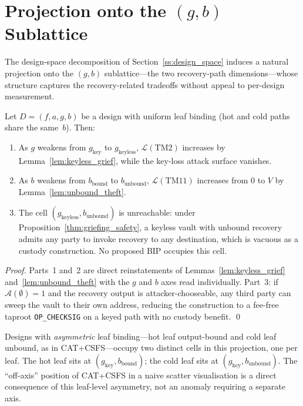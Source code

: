 \section{Projection onto the $(g, b)$ Sublattice} \label{se:two_dim}

The design-space decomposition of Section~\ref{ss:design_space} induces
a natural projection onto the $(g, b)$ sublattice---the two recovery-path
dimensions---whose structure captures the recovery-related tradeoffs
without appeal to per-design measurement.

\begin{lemma}\label{lem:projection}
Let $D = (f, a, g, b)$ be a design with uniform leaf binding (hot and
cold paths share the same~$b$). Then:
\begin{enumerate}
  \item As $g$ weakens from $g_{\text{key}}$ to $g_{\text{keyless}}$,
    $\mathcal{L}(\mathrm{TM2})$ increases by
    Lemma~\ref{lem:keyless_grief}, while the key-loss attack surface
    vanishes.
  \item As $b$ weakens from $b_{\text{bound}}$ to $b_{\text{unbound}}$,
    $\mathcal{L}(\mathrm{TM11})$ increases from $0$ to $V$ by
    Lemma~\ref{lem:unbound_theft}.
  \item The cell $(g_{\text{keyless}}, b_{\text{unbound}})$ is
    unreachable: under Proposition~\ref{thm:griefing_safety}, a
    keyless vault with unbound recovery admits any party to invoke
    recovery to any destination, which is vacuous as a custody
    construction. No proposed BIP occupies this cell.
\end{enumerate}
\end{lemma}

\begin{proof}
Parts~1 and~2 are direct reinstatements of
Lemmas~\ref{lem:keyless_grief} and~\ref{lem:unbound_theft} with the $g$
and $b$ axes read individually. Part~3: if $\mathcal{A}(\emptyset) = 1$
and the recovery output is attacker-chooseable, any third party can
sweep the vault to their own address, reducing the construction to a
fee-free taproot \texttt{OP\_CHECKSIG} on a keyed path with no custody
benefit. \qed
\end{proof}

\begin{remark}\label{rem:asymmetric_binding}
Designs with \emph{asymmetric} leaf binding---hot leaf output-bound
and cold leaf unbound, as in CAT+CSFS---occupy two distinct cells in
this projection, one per leaf. The hot leaf sits at
$(g_{\text{key}}, b_{\text{bound}})$; the cold leaf sits at
$(g_{\text{key}}, b_{\text{unbound}})$. The ``off-axis'' position of
CAT+CSFS in a naive scatter visualisation is a direct consequence of
this leaf-level asymmetry, not an anomaly requiring a separate axis.
\end{remark}

